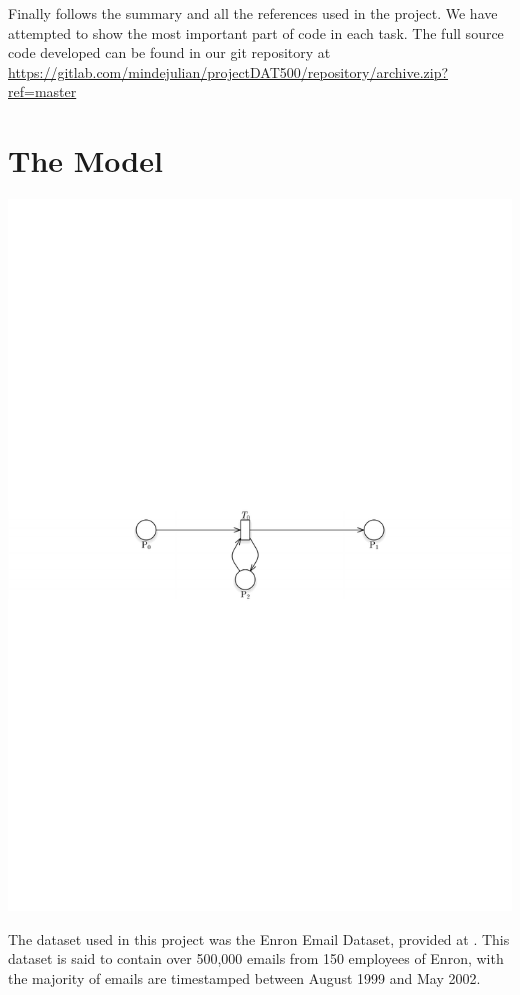 \documentclass[runningheads,a4paper]{llncs}
\begin{document}
\newline
\newline
Finally follows the summary and all the references used in the project.
\newline
\newline
We have attempted to show the most important part of code in each task. The full source code developed can be found in our git repository\cite{git} at \url{https://gitlab.com/mindejulian/projectDAT500/repository/archive.zip?ref=master}


\section{The Model}
\label{sec:2_dataset}
\begin{center}
	\includegraphics[width=\textwidth]{images/test}
\end{center}
The dataset used in this project was the Enron Email Dataset, provided at \cite{dataset}. This dataset is said to contain over 500,000 emails from 150 employees of Enron, with the majority of emails are timestamped between August 1999 and May 2002.
\newline
\end{document}

